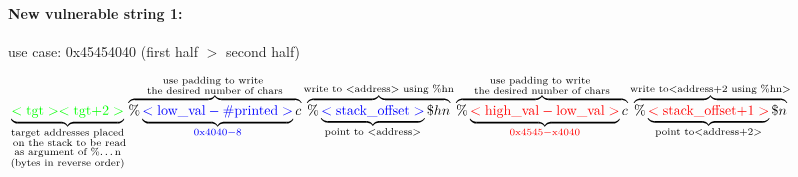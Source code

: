 \documentclass{article}
\begin{document}
\paragraph{New vulnerable string 1:} use case: 0x\color{red}4545\color{blue}4040 \color{black}(\color{red}first half \color{black} $>$ \color{blue} second half\color{black})\\
\begin{adjustwidth}{-3cm}{-3cm}
\centering
$\underbrace{
	\color{green}<\text{tgt}>
	<\text{tgt+2}>
}_{\substack{\text{target addresses placed}\\\text{ on the stack to be read}\\\text{as argument of \%\dots n}\\\text{(bytes in reverse order)}}}
\overbrace{
	\color{black}\%
	\underbrace{
		\color{blue} <\text{low}\_\text{val}-\text{\#printed}>
	}_{
		\color{blue} 0\text{x}4040 - 8\color{black}
	}
	\color{black} c
}^{
	\substack{
		\text{use padding to write }\\
		\text{the desired number of chars}
	}
}
\overbrace{
	\%
	\underbrace{
		\color{blue} <\text{stack}\_
		\text{offset}>
	}_{\text{point to \color{red}}<
	\text{address}>}
	\color{black} \$hn
}^{
	\text{write to }<\text{address}>\text{ using \%hn}
}
\overbrace{
	\color{black} \% 
	\underbrace{
		\color{red} <\text{high}\_\text{val}-\text{low}\_\text{val}>
	}_{
		\color{red} 0\text{x}4545-\text{x}4040
	} 
	\color{black} c
}^{
	\substack{
		\text{use padding to write }\\
		\text{the desired number of chars}
	}
}
\overbrace{
	\color{black} \%
	\underbrace{
		\color{red} <\text{stack}\_\text{offset+1}>
	}_{
		\text{point to}<\text{address+2}>
	}
	\color{black} \$n
}^{
	\text{write to}<\text{address+2 using \%hn}>
}
$
\end{adjustwidth}
\end{document}
